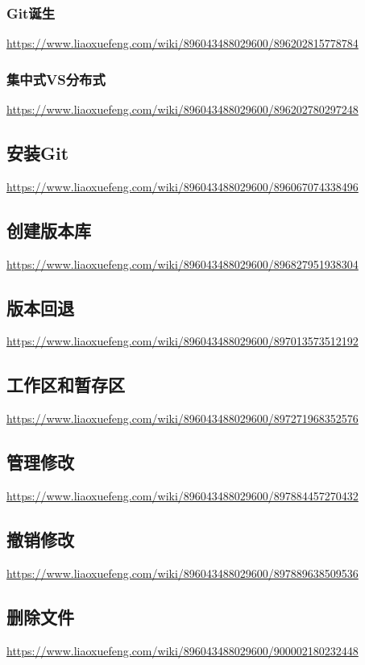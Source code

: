 \documentclass[12pt]{article}
\begin{document}
\subsubsection{Git诞生}
\href{https://www.liaoxuefeng.com/wiki/896043488029600/896202815778784}{https://www.liaoxuefeng.com/wiki/896043488029600/896202815778784}
\subsubsection{集中式VS分布式}
\href{https://www.liaoxuefeng.com/wiki/896043488029600/896202780297248}{https://www.liaoxuefeng.com/wiki/896043488029600/896202780297248}
\subsection{安装Git}
\href{https://www.liaoxuefeng.com/wiki/896043488029600/896067074338496}{https://www.liaoxuefeng.com/wiki/896043488029600/896067074338496}
\subsection{创建版本库}
\href{https://www.liaoxuefeng.com/wiki/896043488029600/896827951938304}{https://www.liaoxuefeng.com/wiki/896043488029600/896827951938304}
\subsection{版本回退}
\href{https://www.liaoxuefeng.com/wiki/896043488029600/897013573512192}{https://www.liaoxuefeng.com/wiki/896043488029600/897013573512192}
\subsection{工作区和暂存区}
\href{https://www.liaoxuefeng.com/wiki/896043488029600/897271968352576}{https://www.liaoxuefeng.com/wiki/896043488029600/897271968352576}
\subsection{管理修改}
\href{https://www.liaoxuefeng.com/wiki/896043488029600/897884457270432}{https://www.liaoxuefeng.com/wiki/896043488029600/897884457270432}
\subsection{撤销修改}
\href{https://www.liaoxuefeng.com/wiki/896043488029600/897889638509536}{https://www.liaoxuefeng.com/wiki/896043488029600/897889638509536}
\subsection{删除文件}
\href{https://www.liaoxuefeng.com/wiki/896043488029600/900002180232448}{https://www.liaoxuefeng.com/wiki/896043488029600/900002180232448}
\end{document}
